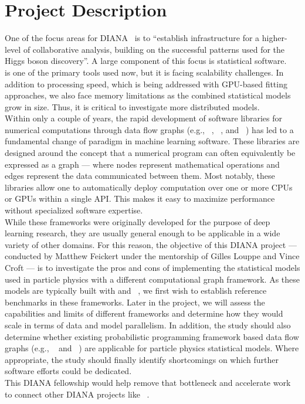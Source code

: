 \section{Project Description}

One of the focus areas for DIANA~\cite{DIANA-proposal-2014} is to ``establish infrastructure for a higher-level of collaborative analysis, building on the successful patterns used for the Higgs boson discovery''.
A large component of this focus is statistical software.
~\cite{Verkerke:2003ir} is one of the primary tools used now, but it is facing scalability challenges.
In addition to processing speed, which is being addressed with GPU-based fitting approaches, we also face memory limitations as the combined statistical models grow in size.
Thus, it is critical to investigate more distributed models.\\

Within only a couple of years, the rapid development of software libraries for numerical computations through data flow graphs (e.g., ~\cite{tensorflow2015-whitepaper}, ~\cite{theano-full}, and ~\cite{DBLP:journals/corr/ChenLLLWWXXZZ15}) has led to a fundamental change of paradigm in machine learning software.
These libraries are designed around the concept that a numerical program can often equivalently be expressed as a graph --- where nodes represent mathematical operations and edges represent the data communicated between them.
Most notably, these libraries allow one to automatically deploy computation over one or more CPUs or GPUs within a single API. This makes it easy to maximize performance without specialized software expertise.\\

While these frameworks were originally developed for the purpose of deep learning research, they are usually general enough to be applicable in a wide variety of other domains.
For this reason, the objective of this DIANA project --- conducted by Matthew Feickert under the mentorship of Gilles Louppe and Vince Croft --- is to investigate the pros and cons of implementing the statistical models used in particle physics with a different computational graph framework.
As these models are typically built with  and ~\cite{Cranmer:2012sba}, we first wish to establish reference benchmarks in these frameworks.
Later in the project, we will assess the capabilities and limits of different frameworks and determine how they would scale in terms of data and model parallelism.
In addition, the study should also determine whether existing probabilistic programming framework based data flow graphs (e.g., ~\cite{tran2016edward} and ~\cite{tensorprob2016}) are applicable for particle physics statistical models.
Where appropriate, the study should finally identify shortcomings on which further software efforts could be dedicated.\\

This DIANA fellowship would help remove that bottleneck and accelerate work to connect other DIANA projects like ~\cite{histogrammar2017}.
